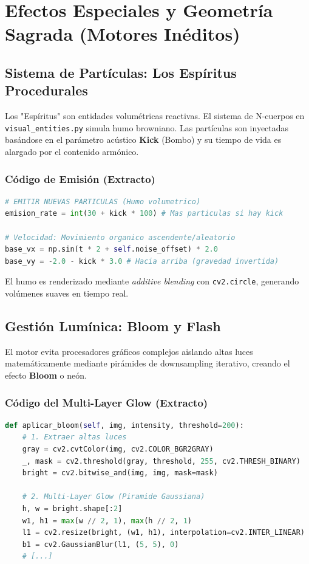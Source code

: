 \documentclass[12pt, openany]{book}
\begin{document}
\part{Efectos Especiales y Geometría Sagrada (Motores Inéditos)}


\chapter{Sistema de Partículas: Los Espíritus Procedurales}
Los "Espíritus" son entidades volumétricas reactivas. El sistema de N-cuerpos en \texttt{visual\_entities.py} simula humo browniano.
Las partículas son inyectadas basándose en el parámetro acústico \textbf{Kick} (Bombo) y su tiempo de vida es alargado por el contenido armónico.

\section{Código de Emisión (Extracto)}
\begin{lstlisting}[language=Python]
# EMITIR NUEVAS PARTICULAS (Humo volumetrico)
emision_rate = int(30 + kick * 100) # Mas particulas si hay kick

# Velocidad: Movimiento organico ascendente/aleatorio
base_vx = np.sin(t * 2 + self.noise_offset) * 2.0
base_vy = -2.0 - kick * 3.0 # Hacia arriba (gravedad invertida)
\end{lstlisting}
El humo es renderizado mediante \textit{additive blending} con \texttt{cv2.circle}, generando volúmenes suaves en tiempo real.

\chapter{Gestión Lumínica: Bloom y Flash}
El motor evita procesadores gráficos complejos aislando altas luces matemáticamente mediante pirámides de downsampling iterativo, creando el efecto \textbf{Bloom} o neón.

\section{Código del Multi-Layer Glow (Extracto)}
\begin{lstlisting}[language=Python]
def aplicar_bloom(self, img, intensity, threshold=200):
    # 1. Extraer altas luces
    gray = cv2.cvtColor(img, cv2.COLOR_BGR2GRAY)
    _, mask = cv2.threshold(gray, threshold, 255, cv2.THRESH_BINARY)
    bright = cv2.bitwise_and(img, img, mask=mask)
    
    # 2. Multi-Layer Glow (Piramide Gaussiana)
    h, w = bright.shape[:2]
    w1, h1 = max(w // 2, 1), max(h // 2, 1)
    l1 = cv2.resize(bright, (w1, h1), interpolation=cv2.INTER_LINEAR)
    b1 = cv2.GaussianBlur(l1, (5, 5), 0)
    # [...]
\end{lstlisting}
\end{document}
